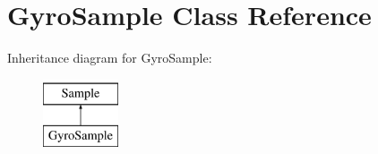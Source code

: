\hypertarget{class_gyro_sample}{\section{Gyro\-Sample Class Reference}
\label{class_gyro_sample}
}
Inheritance diagram for Gyro\-Sample\-:\begin{figure}[H]
\begin{center}
\leavevmode
\includegraphics[height=2.000000cm]{class_gyro_sample}
\end{center}
\end{figure}
